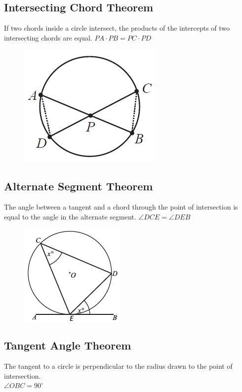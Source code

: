 \documentclass[12pt]{article}
\begin{document}
\newpage

\subsection{Intersecting Chord Theorem}
If two chords inside a circle intersect, the products of the intercepts of two intersecting chords are equal. $PA \cdot PB = PC \cdot PD$

	\begin{figure}[h!]
		\centering
		\includegraphics[height=0.15\textheight]{Graphics/Week_13/IntersectingChords.png}
	\end{figure}
	
\subsection{Alternate Segment Theorem}
The angle between a tangent and a chord through the point of intersection is equal to the angle in the alternate segment. $\angle DCE = \angle DEB$

\begin{figure}[h!]
	\centering
	\includegraphics[height=0.15\textheight]{Graphics/Week_13/AlternateSegment.png}
\end{figure}

\subsection{Tangent Angle Theorem}
The tangent to a circle is perpendicular to the radius drawn to the point of intersection. \\ $\angle OBC = 90^{\circ}$
\end{document}
